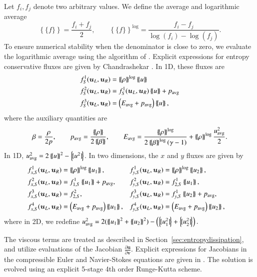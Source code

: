 \documentclass[preprint,10pt]{elsarticle}
\theoremstyle{definition}
\theoremstyle{lemma}
\theoremstyle{theorem}
\theoremstyle{assumption}
\newcommand{\pd}[2]{\frac{\partial#1}{\partial#2}}
\newcommand{\LRp}[1]{\left( #1 \right)}
\newcommand{\LRc}[1]{\left\{ #1 \right\}}
\newcommand{\avg}[1] {\ensuremath{\LRc{\!\{#1\}\!}}}
\newcommand{\note}[1]{{\color{blue}{#1}}}
\begin{document}
{Let $f_i, f_j$ denote two arbitrary values.  We define the average and logarithmic average}
\[
{\avg{f} = \frac{f_i + f_j}{2}}, \qquad {\avg{f}^{\log} = \frac{f_i - f_j}{\log\LRp{f_i}-\log\LRp{f_j}}}.
\]
To ensure numerical stability when the denominator is close to zero, we evaluate the logarithmic average using the algorithm of \cite{ismail2009affordable}.  
Explicit expressions for entropy conservative fluxes are given by Chandrashekar \cite{chandrashekar2013kinetic}.  In 1D, these fluxes are
\begin{align*}
f^1_S(\bm{u}_L,\bm{u}_R) &= \avg{\rho}^{\log} \avg{u}\\
f^2_S(\bm{u}_L,\bm{u}_R) &= f^1_S(\bm{u}_L,\bm{u}_R)\avg{u} + p_{\rm avg}\\
f^3_S(\bm{u}_L,\bm{u}_R) &= \LRp{E_{\rm avg} + p_{\rm avg}}\avg{u},
\end{align*}
where the auxiliary quantities are
\begin{gather*}
{\beta = \frac{\rho}{2p}}, \qquad p_{\rm avg} = \frac{\avg{\rho}}{2\avg{\beta}}, \qquad E_{\rm avg} = \frac{\avg{\rho}^{\log}}{2\avg{\beta}^{\log}\LRp{\gamma -1}}   + \avg{\rho}^{\log}\frac{{u_{\rm avg}^2}}{2}.
\end{gather*}
In 1D, $u_{\rm avg}^2 = 2\avg{u}^2-\avg{u^2}$.  
In two dimensions, the $x$ and $y$ fluxes are given by
\begin{align*}
&f^1_{x,S}(\bm{u}_L,\bm{u}_R) = \avg{\rho}^{\log} \avg{u_1},& &f^1_{y,S}(\bm{u}_L,\bm{u}_R) = \avg{\rho}^{\log} \avg{u_2},&\\
&f^2_{x,S}(\bm{u}_L,\bm{u}_R) = f^1_{1,S} \avg{u_1} + p_{\rm avg},&  &f^2_{y,S}(\bm{u}_L,\bm{u}_R) = f^1_{2,S} \avg{u_1},&\nonumber\\
&f^3_{x,S}(\bm{u}_L,\bm{u}_R) = f^2_{2,S},& &f^3_{y,S}(\bm{u}_L,\bm{u}_R) = f^1_{y,S} \avg{u_2} + p_{\rm avg},&\nonumber\\
&f^4_{x,S}(\bm{u}_L,\bm{u}_R) = \LRp{E_{\rm avg} + p_{\rm avg}}\avg{u_1},& &f^4_{y,S}(\bm{u}_L,\bm{u}_R) = \LRp{E_{\rm avg} + p_{\rm avg} }\avg{u_2},& \nonumber
\end{align*}
where in 2D, we redefine ${u^2_{\rm avg}} = 2(\avg{u_1}^2 + \avg{u_2}^2) - \LRp{\avg{u_1^2} +\avg{u_2^2}}.$

The viscous terms are treated as described in Section~\ref{sec:entropydissipation}, and utilize evaluations of the Jacobian $\pd{\bm{u}}{\bm{v}}$.  Explicit expressions for Jacobians in the compressible Euler and Navier-Stokes equations are given in \cite{hughes1986new}.  The solution is evolved using an explicit 5-stage 4th order Runge-Kutta scheme.  
\end{document}
